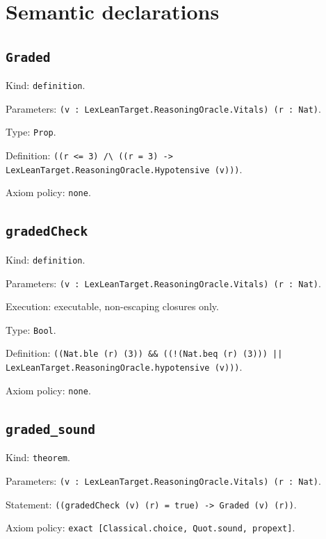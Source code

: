 \documentclass[11pt]{article}
\begin{document}
\section*{Semantic declarations}
\subsection*{\texttt{Graded}}
\noindent Kind: \texttt{definition}.\par
\noindent Parameters: \texttt{(v : LexLeanTarget.ReasoningOracle.Vitals) (r : Nat)}.\par
\noindent Type: \texttt{Prop}.\par
\noindent Definition: \texttt{((r <= 3) /\textbackslash{} ((r = 3) -> LexLeanTarget.ReasoningOracle.Hypotensive (v)))}.\par
\noindent Axiom policy: \texttt{none}.\par
\subsection*{\texttt{gradedCheck}}
\noindent Kind: \texttt{definition}.\par
\noindent Parameters: \texttt{(v : LexLeanTarget.ReasoningOracle.Vitals) (r : Nat)}.\par
\noindent Execution: executable, non-escaping closures only.\par
\noindent Type: \texttt{Bool}.\par
\noindent Definition: \texttt{((Nat.ble (r) (3)) \&\& ((!(Nat.beq (r) (3))) || LexLeanTarget.ReasoningOracle.hypotensive (v)))}.\par
\noindent Axiom policy: \texttt{none}.\par
\subsection*{\texttt{graded\_sound}}
\noindent Kind: \texttt{theorem}.\par
\noindent Parameters: \texttt{(v : LexLeanTarget.ReasoningOracle.Vitals) (r : Nat)}.\par
\noindent Statement: \texttt{((gradedCheck (v) (r) = true) -> Graded (v) (r))}.\par
\noindent Axiom policy: \texttt{exact [Classical.choice, Quot.sound, propext]}.\par
\end{document}
